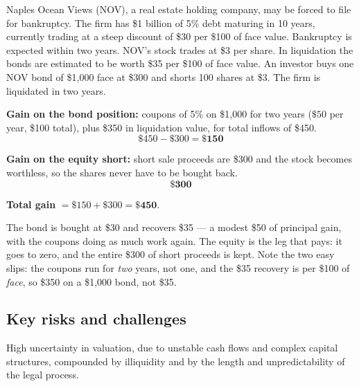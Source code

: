 \begin{imexbox}[title={A capital-structure distressed trade}]
Naples Ocean Views (NOV), a real estate holding company, may be forced to file for
bankruptcy. The firm has \$1 billion of 5\% debt maturing in 10 years, currently
trading at a steep discount of \$30 per \$100 of face value. Bankruptcy is
expected within two years. NOV's stock trades at \$3 per share. In liquidation
the bonds are estimated to be worth \$35 per \$100 of face value. An investor
buys one NOV bond of \$1,000 face at \$300 and shorts 100 shares at \$3. The firm
is liquidated in two years.

\medskip
\textbf{Gain on the bond position:} coupons of 5\% on \$1,000 for two years
($\$50$ per year, \$100 total), plus \$350 in liquidation value, for total
inflows of \$450.
\[ \$450 - \$300 = \mathbf{\$150} \]

\textbf{Gain on the equity short:} short sale proceeds are \$300 and the stock
becomes worthless, so the shares never have to be bought back.
\[ \mathbf{\$300} \]

\textbf{Total gain} $= \$150 + \$300 = \mathbf{\$450}$.
\end{imexbox}

\begin{imtrapbox}[breakable=false,title={Why this is the capital-structure trade in miniature}]
The bond is bought at \$30 and recovers \$35 --- a modest \$50 of principal gain,
with the coupons doing as much work again. The equity is the leg that pays: it
goes to zero, and the entire \$300 of short proceeds is kept.  Note the two easy slips: the coupons run for \emph{two} years,
not one, and the \$35 recovery is per \$100 of \emph{face}, so \$350 on a \$1,000
bond, not \$35.
\end{imtrapbox}

\subsection{Key risks and challenges}

High uncertainty in valuation, due to unstable cash flows and complex capital
structures, compounded by illiquidity and by the length and unpredictability of
the legal process.

